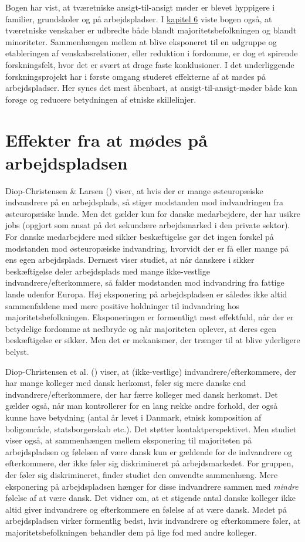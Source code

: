 \documentclass[
]{book}
\begin{document}
Bogen har vist, at tværetniske ansigt-til-ansigt møder er blevet hyppigere i familier, grundskoler og på arbejdspladser. I \hyperref[kap6]{kapitel 6} viste bogen også, at tværetniske venskaber er udbredte både blandt majoritetsbefolkningen og blandt minoriteter. Sammenhængen mellem at blive eksponeret til en udgruppe og etableringen af venskabsrelationer, eller reduktion i fordomme, er dog et spirende forskningsfelt, hvor det er svært at drage faste konklusioner. I det underliggende forskningsprojekt har i første omgang studeret effekterne af at mødes på arbejdspladser. Her synes det mest åbenbart, at ansigt-til-ansigt-møder både kan forøge og reducere betydningen af etniske skillelinjer.

\section{Effekter fra at mødes på arbejdspladsen}\label{effekter-fra-at-muxf8des-puxe5-arbejdspladsen}

Diop-Christensen \& Larsen () viser, at hvis der er mange østeuropæiske indvandrere på en arbejdsplads, så stiger modstanden mod indvandringen fra østeuropæiske lande. Men det gælder kun for danske medarbejdere, der har usikre jobs (opgjort som ansat på det sekundære arbejdsmarked i den private sektor). For danske medarbejdere med sikker beskæftigelse gør det ingen forskel på modstanden mod østeuropæiske indvandring, hvorvidt der er få eller mange på ens egen arbejdsplads. Dernæst viser studiet, at når danskere i sikker beskæftigelse deler arbejdsplads med mange ikke-vestlige indvandrere/efterkommere, så falder modstanden mod indvandring fra fattige lande udenfor Europa. Høj eksponering på arbejdspladsen er således ikke altid sammenfaldene med mere positive holdninger til indvandring hos majoritetsbefolkningen. Eksponeringen er formentligt mest effektfuld, når der er betydelige fordomme at nedbryde og når majoriteten oplever, at deres egen beskæftigelse er sikker. Men det er mekanismer, der trænger til at blive yderligere belyst.

Diop-Christensen et al. () viser, at (ikke-vestlige) indvandrere/efterkommere, der har mange kolleger med dansk herkomst, føler sig mere danske end indvandrere/efterkommere, der har færre kolleger med dansk herkomst. Det gælder også, når man kontrollerer for en lang række andre forhold, der også kunne have betydning (antal år levet i Danmark, etnisk komposition af boligområde, statsborgerskab etc.). Det støtter kontaktperspektivet. Men studiet viser også, at sammenhængen mellem eksponering til majoriteten på arbejdspladsen og følelsen af være dansk kun er gældende for de indvandrere og efterkommere, der ikke føler sig diskrimineret på arbejdsmarkedet. For gruppen, der føler sig diskrimineret, finder studiet den omvendte sammenhæng. Mere eksponering på arbejdspladsen hænger for disse indvandrere sammen med \emph{mindre} følelse af at være dansk. Det vidner om, at et stigende antal danske kolleger ikke altid giver indvandrere og efterkommere en følelse af at være dansk. Mødet på arbejdspladsen virker formentlig bedst, hvis indvandrere og efterkommere føler, at majoritetsbefolkningen behandler dem på lige fod med andre kolleger.
\end{document}
